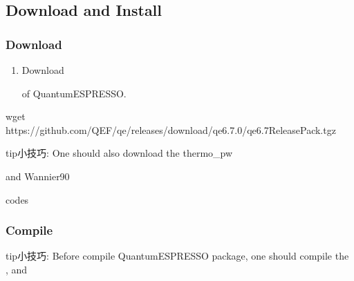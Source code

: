 \documentclass[a4paper,12pt,english]{sphinxmanual}
\begin{document}
\subsection{Download and Install}
\label{\detokenize{compile/Quantum-ESPRESSO_6.7:download-and-install}}\label{\detokenize{compile/Quantum-ESPRESSO_6.7::doc}}

\subsubsection{Download}
\label{\detokenize{compile/Quantum-ESPRESSO_6.7:download}}\begin{enumerate}
%
\item {} 
\sphinxAtStartPar
Download %
\begin{footnote}[4]\sphinxAtStartFootnote
{}
%
\end{footnote} of Quantum\sphinxhyphen{}ESPRESSO.

\end{enumerate}

\begin{sphinxVerbatim}[commandchars=\\\{\}]
wget https://github.com/QEF/q\PYGZhy{}e/releases/download/qe\PYGZhy{}6.7.0/qe\PYGZhy{}6.7\PYGZhy{}ReleasePack.tgz
\end{sphinxVerbatim}

\begin{sphinxadmonition}{tip}{小技巧:}
\sphinxAtStartPar
One should also download the thermo\_pw %
\begin{footnote}[5]\sphinxAtStartFootnote
{}
%
\end{footnote} and Wannier90 %
\begin{footnote}[6]\sphinxAtStartFootnote
{}
%
\end{footnote} codes
\end{sphinxadmonition}


\subsubsection{Compile}
\label{\detokenize{compile/Quantum-ESPRESSO_6.7:compile}}
\begin{sphinxadmonition}{tip}{小技巧:}
\sphinxAtStartPar
Before compile Quantum\sphinxhyphen{}ESPRESSO package, one should compile the {\hyperref[\detokenize{compile/libbeef::doc}]{}}, {\hyperref[\detokenize{compile/libxc_4.3.4::doc}]{}} and {\hyperref[\detokenize{compile/hdf5_1.12.0::doc}]{}}
\end{sphinxadmonition}
\end{document}
